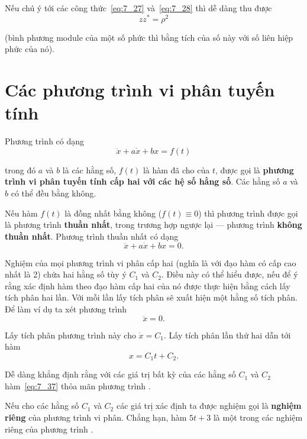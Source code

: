 Nếu chú ý tới các công thức~\eqref{eq:7_27} và~\eqref{eq:7_28} thì dễ dàng thu được
\begin{equation}\label{eq:7_33}
	zz^* = \rho^2
\end{equation}

\noindent
(bình phương module của một số phức thì bằng tích của số này với số liên hiệp phức của nó).

\section{Các phương trình vi phân tuyến tính}\label{sec:7_4}

Phương trình có dạng
\begin{equation}\label{eq:7_34}
	\ddot{x} + a\dot{x} + bx = f(t)
\end{equation}

\noindent
trong đó $a$ và $b$ là các hằng số, $f(t)$ là hàm đã cho của $t$, được gọi là \textbf{phương trình vi phân tuyến tính cấp hai với các hệ số hằng số}. Các hằng số $a$ và $b$ có thể đều bằng không.

Nếu hàm $f(t)$ là đồng nhất bằng không ($f(t)\equiv 0$) thì phương trình được gọi là phương trình \textbf{thuần nhất}, trong trương hợp ngược lại --- phương trình \textbf{không thuần nhất}. Phương trình thuần nhất có dạng
\begin{equation}\label{eq:7_35}
	\ddot{x} + a\dot{x} + bx = 0.
\end{equation}

Nghiệm của mọi phương trình vi phân cấp hai (nghĩa là với đạo hàm có cấp cao nhất là 2) chứa hai hằng số tùy ý $C_1$ và $C_2$. Điều này có thể hiểu được, nếu để ý rằng xác định hàm theo đạo hàm cấp hai của nó được thực hiện bằng cách lấy tích phân hai lần. Với mỗi lần lấy tích phân sẽ xuất hiện một hằng số tích phân. Để làm ví dụ ta xét phương trình
\begin{equation}\label{eq:7_36}
	\ddot{x} = 0.
\end{equation}

\noindent
Lấy tích phân phương trình này cho $\dot{x}=C_1$. Lấy tích phân lần thứ hai dẫn tới hàm
\begin{equation}\label{eq:7_37}
	x = C_1 t + C_2.
\end{equation}

\noindent
Dễ dàng khẳng định rằng với các giá trị bất kỳ của các hằng số $C_1$ và $C_2$ hàm~\eqref{eq:7_37} thỏa mãn phương trình .

Nếu cho các hằng số $C_1$ và $C_2$ các giá trị xác định ta được nghiệm gọi là \textbf{nghiệm riêng} của phương trình vi phân. Chẳng hạn, hàm $5t+3$ là một trong các nghiệm riêng của phương trình .

